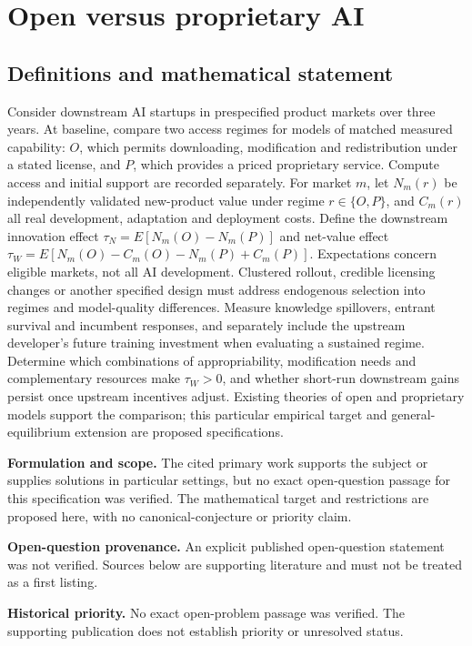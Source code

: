 \documentclass[11pt]{article}
\begin{document}
\section*{Open versus proprietary AI}\label{30007699}
\subsection{Definitions and mathematical statement}
Consider downstream AI startups in prespecified product markets over three years. At baseline, compare two access regimes for models of matched measured capability: \(O\), which permits downloading, modification and redistribution under a stated license, and \(P\), which provides a priced proprietary service. Compute access and initial support are recorded separately. For market \(m\), let \(N_m(r)\) be independently validated new-product value under regime \(r\in\{O,P\}\), and \(C_m(r)\) all real development, adaptation and deployment costs. Define the downstream innovation effect \(\tau_N=E[N_m(O)-N_m(P)]\) and net-value effect \(\tau_W=E[N_m(O)-C_m(O)-N_m(P)+C_m(P)]\). Expectations concern eligible markets, not all AI development. Clustered rollout, credible licensing changes or another specified design must address endogenous selection into regimes and model-quality differences. Measure knowledge spillovers, entrant survival and incumbent responses, and separately include the upstream developer's future training investment when evaluating a sustained regime. Determine which combinations of appropriability, modification needs and complementary resources make \(\tau_W>0\), and whether short-run downstream gains persist once upstream incentives adjust. Existing theories of open and proprietary models support the comparison; this particular empirical target and general-equilibrium extension are proposed specifications.

\par\textbf{Formulation and scope.} The cited primary work supports the subject or supplies solutions in particular settings, but no exact open-question passage for this specification was verified. The mathematical target and restrictions are proposed here, with no canonical-conjecture or priority claim.

\par\textbf{Open-question provenance.} An explicit published open-question statement was not verified. Sources below are supporting literature and must not be treated as a first listing.

\par\textbf{Historical priority.} No exact open-problem passage was verified. The supporting publication does not establish priority or unresolved status.
\end{document}
